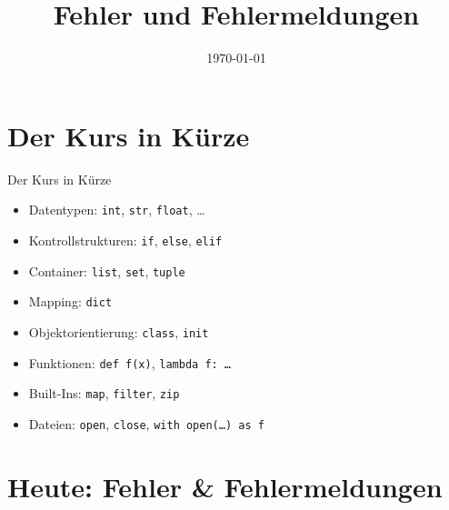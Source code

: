 



\title{Fehler und Fehlermeldungen}
\date{\today}

\usepackage{tikz} \usetikzlibrary{arrows, positioning}




\maketitle

\section{Der Kurs in Kürze}
\begin{frame}{Der Kurs in Kürze}
    \begin{itemize}
        \item Datentypen: \texttt{int}, \texttt{str}, \texttt{float}, \ldots
        \item Kontrollstrukturen: \texttt{if}, \texttt{else}, \texttt{elif}
        \item Container: \texttt{list}, \texttt{set}, \texttt{tuple}
        \item Mapping: \texttt{dict}
        \item Objektorientierung: \texttt{class}, \texttt{init}
        \item Funktionen: \texttt{def f(x)}, \texttt{lambda f: \ldots}
        \item Built-Ins: \texttt{map}, \texttt{filter}, \texttt{zip}
        \item Dateien: \texttt{open}, \texttt{close}, \texttt{with open(\ldots) as f}
    \end{itemize}
\end{frame}

\section{Heute: Fehler \& Fehlermeldungen}

